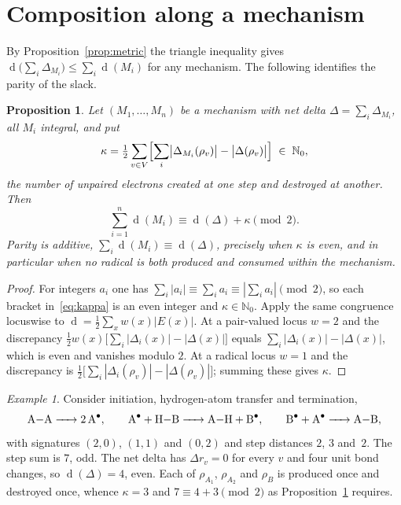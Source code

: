 \documentclass[11pt]{article}
\numberwithin{equation}{section}
\newcommand{\del}{\operatorname{d}}
\theoremstyle{plain}
\newtheorem{proposition}[theorem]{Proposition}
\theoremstyle{definition}
\theoremstyle{remark}
\newtheorem{example}[theorem]{Example}
\begin{document}
\section{Composition along a mechanism}
\label{sec:composition}

By Proposition~\ref{prop:metric} the triangle inequality gives
$\del\bigl(\sum_i\Delta_{M_i}\bigr)\le\sum_i\del(M_i)$ for any mechanism.  The
following identifies the parity of the slack.

\begin{proposition}
\label{prop:composition}
Let $(M_1,\dots,M_n)$ be a mechanism with net delta
$\Delta=\sum_i\Delta_{M_i}$, all $M_i$ integral, and put
\begin{equation}
  \kappa=\tfrac12\sum_{v\in V}
    \Bigl[\sum_{i}\bigl|\Delta_{M_i}(\rho_v)\bigr|-\bigl|\Delta(\rho_v)\bigr|\Bigr]
  \;\in\;\mathbb N_0 ,
  \label{eq:kappa}
\end{equation}
the number of unpaired electrons created at one step and destroyed at another.
Then
\begin{equation}
  \sum_{i=1}^{n}\del(M_i)\equiv\del(\Delta)+\kappa\pmod 2 .
  \label{eq:composition}
\end{equation}
Parity is additive, $\sum_i\del(M_i)\equiv\del(\Delta)$, precisely when
$\kappa$ is even, and in particular when no radical is both produced and
consumed within the mechanism.
\end{proposition}

\begin{proof}
For integers $a_i$ one has $\sum_i|a_i|\equiv\sum_i a_i\equiv|\sum_i a_i|
\pmod2$, so each bracket in~\eqref{eq:kappa} is an even integer and $\kappa\in
\mathbb N_0$.  Apply the same congruence locuswise to
$\del=\tfrac12\sum_x w(x)|E(x)|$.  At a pair-valued locus $w=2$ and the
discrepancy $\tfrac12 w(x)\bigl[\sum_i|\Delta_i(x)|-|\Delta(x)|\bigr]$ equals
$\sum_i|\Delta_i(x)|-|\Delta(x)|$, which is even and vanishes modulo $2$.  At a
radical locus $w=1$ and the discrepancy is
$\tfrac12\bigl[\sum_i|\Delta_i(\rho_v)|-|\Delta(\rho_v)|\bigr]$; summing these
gives $\kappa$.
\end{proof}

\begin{example}
\label{ex:chain}
Consider initiation, hydrogen-atom transfer and termination,
\[
  \ce{A-A -> 2A^{.}},\qquad
  \ce{A^{.} + H-B -> A-H + B^{.}},\qquad
  \ce{B^{.} + A^{.} -> A-B},
\]
with signatures $(2,0)$, $(1,1)$ and $(0,2)$ and step distances $2$, $3$
and~$2$.  The step sum is $7$, odd.  The net delta has $\Delta r_v=0$ for every
$v$ and four unit bond changes, so $\del(\Delta)=4$, even.  Each of
$\rho_{A_1}$, $\rho_{A_2}$ and $\rho_B$ is produced once and destroyed once,
whence $\kappa=3$ and $7\equiv4+3\pmod2$ as
Proposition~\ref{prop:composition} requires.
\end{example}
\end{document}

